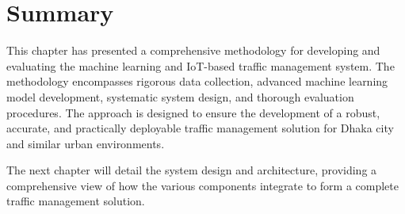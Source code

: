 \section{Summary}

This chapter has presented a comprehensive methodology for developing and evaluating the machine learning and IoT-based traffic management system. The methodology encompasses rigorous data collection, advanced machine learning model development, systematic system design, and thorough evaluation procedures. The approach is designed to ensure the development of a robust, accurate, and practically deployable traffic management solution for Dhaka city and similar urban environments.

The next chapter will detail the system design and architecture, providing a comprehensive view of how the various components integrate to form a complete traffic management solution. 